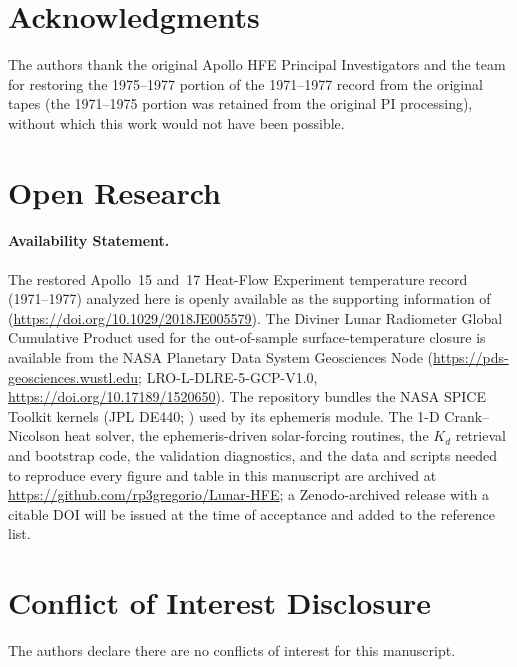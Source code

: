\documentclass[11pt]{article}
\begin{document}
\section*{Acknowledgments}
The authors thank the original Apollo HFE Principal Investigators and the
\citet{nagihara2018} team for restoring the 1975--1977 portion of the
1971--1977 record from the original tapes (the 1971--1975 portion was
retained from the original PI processing), without which this work would not
have been possible.


\section*{Open Research}\label{sec:openresearch}
\paragraph*{Availability Statement.}
The restored Apollo~15 and~17 Heat-Flow Experiment temperature record
(1971--1977) analyzed here is openly available as the supporting
information of \citet{nagihara2018} (\url{https://doi.org/10.1029/2018JE005579}).
The Diviner Lunar Radiometer Global Cumulative Product used for the
out-of-sample surface-temperature closure \citep{williams2017diviner} is
available from the NASA Planetary Data System Geosciences Node
(\url{https://pds-geosciences.wustl.edu}; LRO-L-DLRE-5-GCP-V1.0,
\url{https://doi.org/10.17189/1520650}). The
repository bundles the NASA SPICE Toolkit kernels (JPL DE440;
\citealp{acton1996,acton2018}) used by its ephemeris module. The 1-D
Crank--Nicolson heat solver, the
ephemeris-driven solar-forcing routines, the $K_d$ retrieval and bootstrap
code, the validation diagnostics, and the data and scripts needed to
reproduce every figure and table in this manuscript are archived at
\url{https://github.com/rp3gregorio/Lunar-HFE}; a
Zenodo-archived release with a citable DOI will be issued at the time of
acceptance and added to the reference list.


\section*{Conflict of Interest Disclosure}
The authors declare there are no conflicts of interest for this manuscript.
\end{document}
